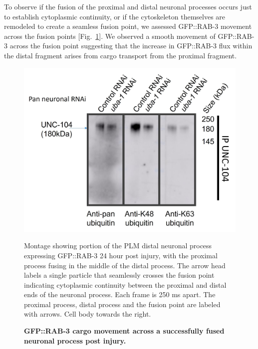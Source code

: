 \begin{appendices}
To observe if the fusion of the proximal and distal neuronal processes occurs just to establish cytoplasmic continuity, or if the cytoskeleton themselves are remodeled to create a seamless fusion point, we assessed GFP::RAB-3 movement across the fusion points [Fig.~\ref{fig:Atrayeemontage}]. We observed a smooth movement of GFP::RAB-3 across the fusion point suggesting that the increase in GFP::RAB-3 flux within the distal fragment arises from cargo transport from the proximal fragment.

\begin{figure}[H]
	\begin{minipage}[t]{0.45\textwidth}
		\vspace{0pt}
		\includegraphics[width=\textwidth]{figs/example}
	\end{minipage}\hfill
	\begin{minipage}[t]{0.5\textwidth}
		\vspace{0pt}
		\caption[GFP::RAB-3 cargo movement across a successfully fused neuronal process post injury.]{\textbf{GFP::RAB-3 cargo movement across a successfully fused neuronal process post injury.}} \raggedright \small Montage showing portion of the PLM distal neuronal process expressing GFP::RAB-3 24 hour post injury, with the proximal process fusing in the middle of the distal process. The arrow head labels a single particle that seamlessly crosses the fusion point indicating cytoplasmic continuity between the proximal and distal ends of the neuronal process. Each frame is 250 ms apart. The proximal process, distal process and the fusion point are labeled with arrows. Cell body towards the right. \label{fig:Atrayeemontage}
	\end{minipage}
\end{figure}


\end{appendices}
